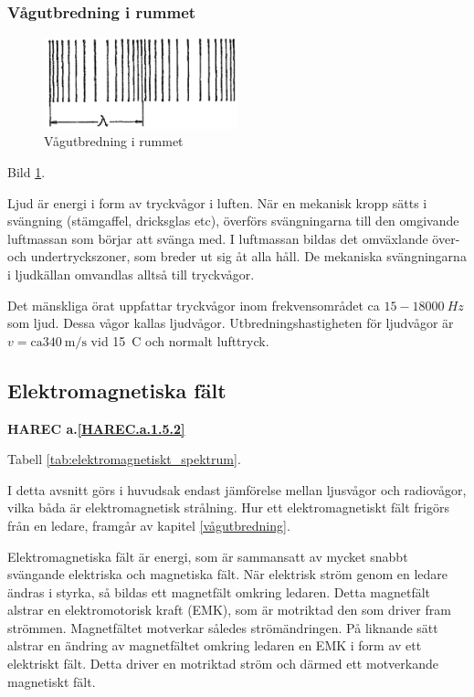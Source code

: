 \subsubsection{Vågutbredning i rummet}

\begin{figure}
  \includegraphics[width=0.5\textwidth]{images/cropped_pdfs/bild_2_1-12.pdf}
  \caption{Vågutbredning i rummet}
  \label{fig:BildII1-12}
\end{figure}

Bild \ref{fig:BildII1-12}.

Ljud är energi i form av tryckvågor i luften. När en mekanisk kropp sätts i
svängning (stämgaffel, dricksglas etc), överförs svängningarna till den
omgivande luftmassan som börjar att svänga med. I luftmassan bildas det
omväxlande över- och undertryckszoner, som breder ut sig åt alla håll. De
mekaniska svängningarna i ljudkällan omvandlas alltså till tryckvågor.

Det mänskliga örat uppfattar tryckvågor inom frekvensområdet ca
\(15-18000\ Hz\) som ljud. Dessa vågor kallas ljudvågor. Utbredningshastigheten
för ljudvågor är \(v = \text{ca} 340\ \text{m/s}\) vid 15~\degree C och normalt lufttryck.

\subsection{Elektromagnetiska fält}
\textbf{HAREC a.\ref{HAREC.a.1.5.2}\label{myHAREC.a.1.5.2}}

Tabell \ref{tab:elektromagnetiskt_spektrum}.

I detta avsnitt görs i huvudsak endast jämförelse mellan ljusvågor och
radiovågor, vilka båda är elektromagnetisk strålning. Hur ett elektromagnetiskt
fält frigörs från en ledare, framgår av kapitel \ref{vågutbredning}.

Elektromagnetiska fält är energi, som är sammansatt av mycket snabbt svängande
elektriska och magnetiska fält. När elektrisk ström genom en ledare ändras i
styrka, så bildas ett magnetfält omkring ledaren. Detta magnetfält alstrar en
elektromotorisk kraft (EMK), som är motriktad den som driver fram strömmen.
Magnetfältet motverkar således strömändringen. På liknande sätt alstrar en
ändring av magnetfältet omkring ledaren en EMK i form av ett elektriskt fält.
Detta driver en motriktad ström och därmed ett motverkande magnetiskt fält.

